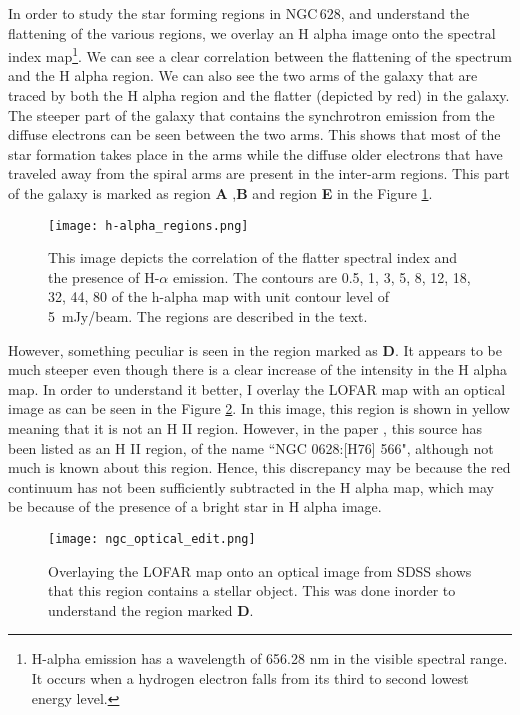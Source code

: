 \documentclass[../main/thesis_msc.tex]{subfiles}
\begin{document}
In order to study the star forming regions in NGC\,628, and understand the flattening of the various regions, we overlay an H alpha image onto the spectral index map\footnote{H-alpha emission has a wavelength of 656.28 nm in the visible spectral range. It occurs when a hydrogen electron falls from its third to second lowest energy level.}. We can see a clear correlation between the flattening of the spectrum and the H alpha region. We can also see the two arms of the galaxy that are traced by both the H alpha region and the flatter (depicted by red) in the galaxy. The steeper part of the galaxy that contains the synchrotron emission from the diffuse electrons can be seen between the two arms. This shows that most of the star formation takes place in the arms while the diffuse older electrons that have traveled away from the spiral arms are present in the inter-arm regions. This part of the galaxy is marked as region \textbf{A} ,\textbf{B} and region \textbf{E} in the Figure \ref{hlaph_ng}.\\
\begin{figure}
\centering
\texttt{[image: h-alpha\_regions.png]}
\caption{This image depicts the correlation of the flatter spectral index and the presence of H-$\alpha$ emission. The contours are 0.5, 1, 3, 5, 8, 12, 18, 32, 44, 80 of the h-alpha map with unit contour level of 5~mJy/beam. The regions are described in the text.}
\label{hlaph_ng}
\end{figure}
However, something peculiar is seen in the region marked as \textbf{D}. It appears to be much steeper even though there is a clear increase of the intensity in the H alpha map. In order to understand it better, I overlay the LOFAR map with an optical image as can be seen in the Figure \ref{optical}. In this image, this region is shown in yellow meaning that it is not an H II region. However, in the paper \citet{1980ApJ...241..573K}, this source has been listed as an H II region, of the name ``NGC 0628:[H76] 566", although not much is known about this region. Hence, this discrepancy may be because the red continuum has not been sufficiently subtracted in the H alpha map, which may be because of the presence of a bright star in H alpha image. \\
\begin{figure}
\centering
\texttt{[image: ngc\_optical\_edit.png]}
\caption{Overlaying the LOFAR map onto an optical image from SDSS shows that this region contains a stellar object. This was done inorder to understand the region marked \textbf{D}.}
\label{optical}
\end{figure}
\end{document}

